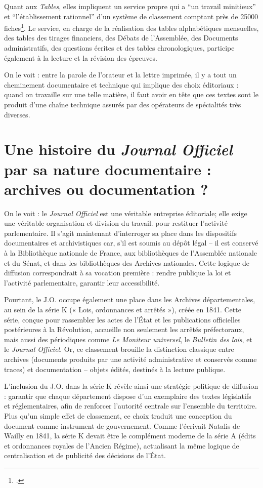 Quant aux \emph{Tables}, elles impliquent un service propre qui a \enquote{un travail minitieux} et \enquote{l'établissement rationnel} d'un système de classement comptant près de 25000 fiches\footcite[][]{cote6}. Le service, en charge de la réalisation des tables alphabétiques mensuelles, des tables des tirages financiers, des Débats de l'Assemblée, des Documents administratifs, des questions écrites et des tables chronologiques, participe également à la lecture et la révision des épreuves. 

On le voit : entre la parole de l'orateur et la lettre imprimée, il y a tout un cheminement documentaire et technique qui implique des choix éditoriaux : quand on travaille sur une telle matière, il faut avoir en tête que ces textes sont le produit d'une chaîne technique assurés par des opérateurs de spécialités très diverses.

\section{Une histoire du \emph{Journal Officiel} par sa nature documentaire : archives ou documentation ?}

On le voit : le \emph{Journal Officiel} est une véritable entreprise éditoriale; elle exige une véritable organisation et division du travail. pour restituer l'activité parlementaire. Il s’agit maintenant d’interroger sa place dans les dispositifs documentaires et archivistiques car, s'il est soumis au dépôt légal -- il est conservé à la Bibliothèque nationale de France, aux bibliothèques de l’Assemblée nationale et du Sénat, et dans les bibliothèques des Archives nationales. Cette logique de diffusion correspondrait à sa vocation première : rendre publique la loi et l’activité parlementaire, garantir leur accessibilité.

Pourtant, le J.O. occupe également une place dans les Archives départementales, au sein de la série K (« Lois, ordonnances et arrêtés »), créée en 1841. Cette série, conçue pour rassembler les actes de l’État et les publications officielles postérieures à la Révolution, accueille non seulement les arrêtés préfectoraux, mais aussi des périodiques comme \emph{Le Moniteur universel}, le \emph{Bulletin des lois}, et le \emph{Journal Officiel}. Or, ce classement brouille la distinction classique entre archives (documents produits par une activité administrative et conservés comme traces) et documentation -- objets édités, destinés à la lecture publique.

L’inclusion du J.O. dans la série K révèle ainsi une stratégie politique de diffusion : garantir que chaque département dispose d’un exemplaire des textes législatifs et réglementaires, afin de renforcer l’autorité centrale sur l’ensemble du territoire. Plus qu’un simple effet de classement, ce choix traduit une conception du document comme instrument de gouvernement. Comme l’écrivait Natalis de Wailly en 1841, la série K devait être le complément moderne de la série A (édits et ordonnances royales de l’Ancien Régime), actualisant la même logique de centralisation et de publicité des décisions de l’État.

